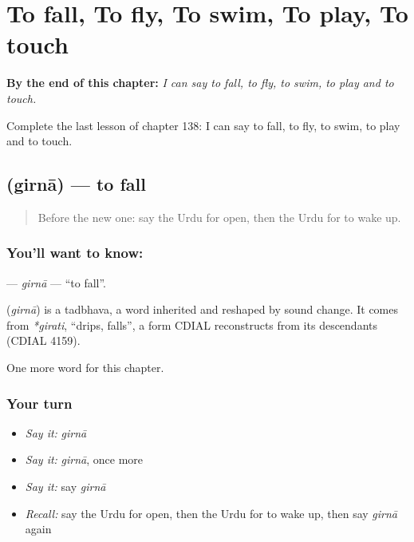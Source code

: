 
\chapter{To fall, To fly, To swim, To play, To touch}
\label{ch:ur-to-fall-to-fly-to-swim-to-play-to-touch}

\begin{chapteropening}
\textbf{By the end of this chapter:} \emph{I can say to fall, to fly, to swim, to play and to touch.}

Complete the last lesson of chapter 138: I can say to fall, to fly, to swim, to play and to touch.
\end{chapteropening}

\section[\texorpdfstring{\ur{گرنا} (girnā)}{گرنا (girnā)}]{ (girnā) — to fall}

\label{lesson:UR-C138-girna}



\begin{quote}
Before the new one: say the Urdu for open, then the Urdu for to wake up.
\end{quote}

\subsection*{You'll want to know: }
\textbf{} — \emph{girnā} — \textquotedblleft{}to fall\textquotedblright{}.

\begin{cousinweb}
\textbf{} (\emph{girnā}) is a tadbhava, a word inherited and reshaped by sound change. It comes from \emph{*girati}, \textquotedblleft{}drips, falls\textquotedblright{}, a form CDIAL reconstructs from its descendants (CDIAL 4159).
\end{cousinweb}

\begin{grammarlens}[title={What you've built}]
One more word for this chapter.
\end{grammarlens}

\subsection*{Your turn}
\begin{itemize}
\raggedright
  \item \emph{Say it:} \emph{girnā}
  \item \emph{Say it:} \emph{girnā}, once more
  \item \emph{Say it:} say \emph{girnā}
  \item \emph{Recall:} say the Urdu for open, then the Urdu for to wake up, then say \emph{girnā} again
\end{itemize}

